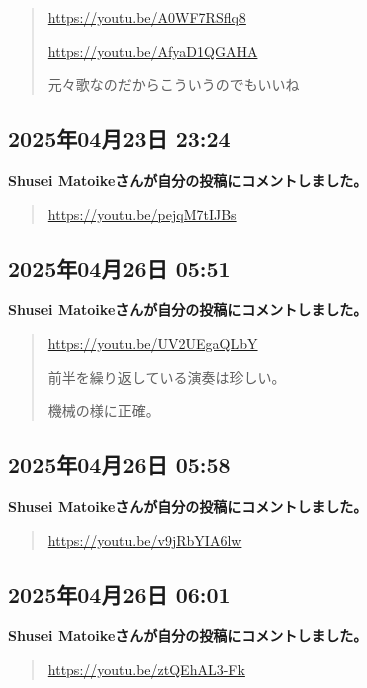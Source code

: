 \begin{quote}
\url{https://youtu.be/A0WF7RSflq8}

\url{https://youtu.be/AfyaD1QGAHA}

元々歌なのだからこういうのでもいいね
\end{quote}

\subsection*{2025年04月23日 23:24}

\textbf{Shusei Matoikeさんが自分の投稿にコメントしました。}

\begin{quote}
\url{https://youtu.be/pejqM7tIJBs}
\end{quote}

\subsection*{2025年04月26日 05:51}

\textbf{Shusei Matoikeさんが自分の投稿にコメントしました。}

\begin{quote}
\url{https://youtu.be/UV2UEgaQLbY}

前半を繰り返している演奏は珍しい。

機械の様に正確。
\end{quote}

\subsection*{2025年04月26日 05:58}

\textbf{Shusei Matoikeさんが自分の投稿にコメントしました。}

\begin{quote}
\url{https://youtu.be/v9jRbYIA6lw}
\end{quote}

\subsection*{2025年04月26日 06:01}

\textbf{Shusei Matoikeさんが自分の投稿にコメントしました。}

\begin{quote}
\url{https://youtu.be/ztQEhAL3-Fk}
\end{quote}

